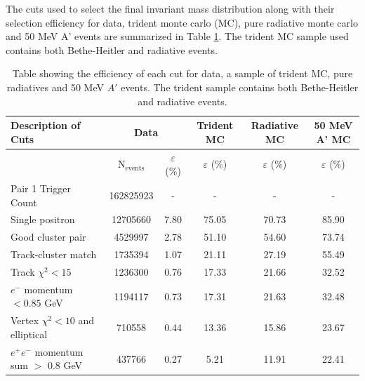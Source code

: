 The cuts used to select the final invariant mass distribution along with their
selection efficiency for data, trident monte carlo (MC), pure radiative 
monte carlo and 50 MeV A' events are summarized in Table \ref{tab:sel_eff}.
The trident MC sample used contains both Bethe-Heitler and radiative events.

\begin{table}
    \centering
    \begin{tabular}{l||c|c|c|c|c}
        \toprule
        \textbf{Description of Cuts} 
        & \multicolumn{2}{c|}{\textbf{Data}}
        & \textbf{Trident MC}
        & \textbf{Radiative MC}
        & \textbf{50 MeV A' MC} \\
        \midrule
        \midrule
        & N$_{\text{events}}$ & $\varepsilon$ (\%)
        & $\varepsilon$ (\%) 
        & $\varepsilon$ (\%)
        & $\varepsilon$ (\%) \\ 
        \midrule
        \midrule
        Pair 1 Trigger Count & 162825923 & -  & - & - & - \\
        Single positron & 12705660 & 7.80  & 75.05 & 70.73 & 85.90 \\
        Good cluster pair & 4529997 & 2.78  & 51.10 & 54.60 & 73.74 \\
        Track-cluster match & 1735394 & 1.07  & 21.11 & 27.19 &55.49 \\
        Track $\chi^2 < 15$ &1236300  & 0.76  &17.33  & 21.66 &32.52  \\
        $e^-$ momentum $ < 0.85$ GeV & 1194117 & 0.73  & 17.31 & 21.63 &32.48  \\
        Vertex $\chi^2 < 10$ and elliptical &710558  & 0.44  &13.36  & 15.86& 23.67 \\
        $e^+e^-$ momentum sum $>$ 0.8 GeV & 437766 & 0.27   & 5.21 & 11.91 &22.41  \\
        \bottomrule
    \end{tabular}
    \caption{Table showing the efficiency of each cut for data, a sample of 
             trident MC, pure radiatives and 50 MeV $A'$ events.  The trident sample
             contains both Bethe-Heitler and radiative events.}
    \label{tab:sel_eff}
\end{table}

